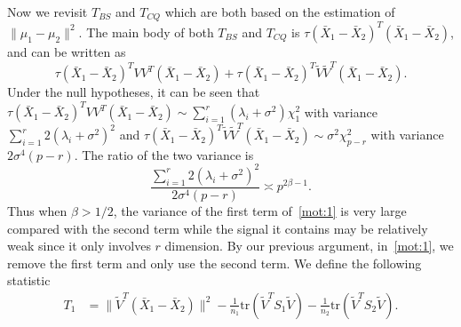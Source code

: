 \documentclass[review]{elsarticle}
\theoremstyle{plain}
\theoremstyle{definition}
\theoremstyle{remark}
\begin{document}
Now we revisit $T_{BS}$ and $T_{CQ}$ which are both based on the estimation of $\|\mu_1-\mu_2\|^2$.
The main body of both $T_{BS}$ and $T_{CQ}$ is
$
    \tau{(\bar{X}_1-\bar{X}_2)}^T (\bar{X}_1-\bar{X}_2)
$, and can be written as
\begin{equation}\label{mot:1}
    \tau{(\bar{X}_1-\bar{X}_2)}^T V V^T (\bar{X}_1-\bar{X}_2)+
    \tau{(\bar{X}_1-\bar{X}_2)}^T \tilde{V} \tilde{V}^T (\bar{X}_1-\bar{X}_2).
\end{equation}
Under the null hypotheses, it can be seen that $\tau{(\bar{X}_1-\bar{X}_2)}^T V V^T (\bar{X}_1-\bar{X}_2)\sim \sum_{i=1}^r (\lambda_i+\sigma^2)\chi^2_1$ with variance $\sum_{i=1}^r 2(\lambda_i+\sigma^2)^2$ and $\tau{(\bar{X}_1-\bar{X}_2)}^T \tilde{V} \tilde{V}^T (\bar{X}_1-\bar{X}_2)\sim \sigma^2\chi^2_{p-r}$ with variance $2\sigma^4 (p-r)$.
The ratio of the two variance is
$$
\frac{\sum_{i=1}^r 2(\lambda_i+\sigma^2)^2}{2\sigma^4 (p-r)}
\asymp
p^{2\beta-1}.
$$
Thus when $\beta>1/2$, the variance of the first term of~\eqref{mot:1} is very large compared with the second term while the signal it contains may be relatively weak since it only involves $r$ dimension.
 By our previous argument, in~\eqref{mot:1}, we remove the first term and only use the second term.
We define the following statistic
\begin{equation*}
\begin{aligned}
    T_{1}&=\|\tilde{V}^T(\bar{X}_1-\bar{X}_2)\|^2-\frac{1}{n_1}\mathrm{tr}(\tilde{V}^T S_1\tilde{V})-\frac{1}{n_2}\mathrm{tr}(\tilde{V}^T S_2\tilde{V}).
    \\
\end{aligned}
\end{equation*}
\end{document}
